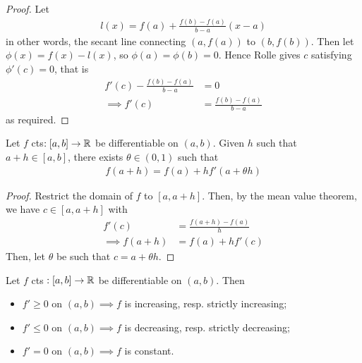 \documentclass{../template/note}
\begin{document}
    \begin{proof}
        Let
        \begin{align*}
            l(x) = f(a) + \frac{f(b)-f(a)}{b-a}(x-a)
        \end{align*}
        in other words, the secant line connecting \((a, f(a))\) to \((b, f(b))\). Then let \(\phi(x) = f(x) - l(x)\), so \(\phi(a) = \phi(b) = 0\). Hence Rolle gives \(c\) satisfying \(\phi'(c) = 0\), that is
        \begin{align*}
            f'(c) - \frac{f(b)-f(a)}{b-a} &= 0 \\
            \implies f'(c) &= \frac{f(b)-f(a)}{b-a}
        \end{align*}
        as required.
    \end{proof}
    
    \begin{corollary}
        \label{mvt-cor-1}
        Let \(f\) cts\(: [a, b] \to \mathbb R\) be differentiable on \((a, b)\). Given \(h\) such that \(a + h \in [a, b]\), there exists \(\theta \in (0, 1)\) such that
        \begin{align*}
            f(a+h) = f(a) + hf'(a+\theta h)
        \end{align*}
    \end{corollary}
    
    \begin{proof}
        Restrict the domain of \(f\) to \([a, a+h]\). Then, by the mean value theorem, we have \(c \in [a, a+h]\) with
        \begin{align*}
            f'(c) &= \frac{f(a+h)-f(a)}{h} \\
            \implies f(a+h) &= f(a) + hf'(c)
        \end{align*}
        Then, let \(\theta\) be such that \(c = a+\theta h\).        
    \end{proof}
    
    \begin{corollary}
        \label{mvt-cor-2}
        Let \(f\) cts \(: [a, b] \to \mathbb R\) be differentiable on \((a, b)\). Then
        \begin{itemize}
            \item \(f' \geq 0\) on \((a,b) \implies f\) is increasing, resp. strictly increasing;
            \item \(f' \leq 0\) on \((a,b) \implies f\) is decreasing, resp. strictly decreasing;
            \item \(f' = 0\) on \((a,b) \implies f\) is constant.
        \end{itemize}
    \end{corollary}
    
\end{document}
